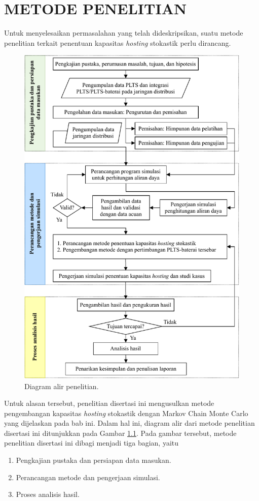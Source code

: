 \chapter{METODE PENELITIAN}
Untuk menyelesaikan permasalahan yang telah dideskripsikan, suatu metode penelitian terkait penentuan kapasitas \textit{\textit{hosting}} stokastik perlu dirancang.
\begin{figure}[!b]
	\centering
	\includegraphics[width=1\textwidth]{Fig/fcpenelitian}
	\caption{Diagram alir penelitian.}
	\label{tahapan}
\end{figure}
Untuk alasan tersebut, penelitian disertasi ini mengusulkan metode pengembangan kapasitas \textit{\textit{hosting}} stokastik dengan Markov Chain Monte Carlo yang dijelaskan pada bab ini. Dalam hal ini, diagram alir dari metode penelitian disertasi ini ditunjukkan pada Gambar \ref{tahapan}. Pada gambar tersebut, metode penelitian disertasi ini dibagi menjadi tiga bagian, yaitu
\begin{enumerate}
	\item Pengkajian pustaka dan persiapan data masukan.
	\item Perancangan metode dan pengerjaan simulasi.
	\item Proses analisis hasil.
\end{enumerate}

